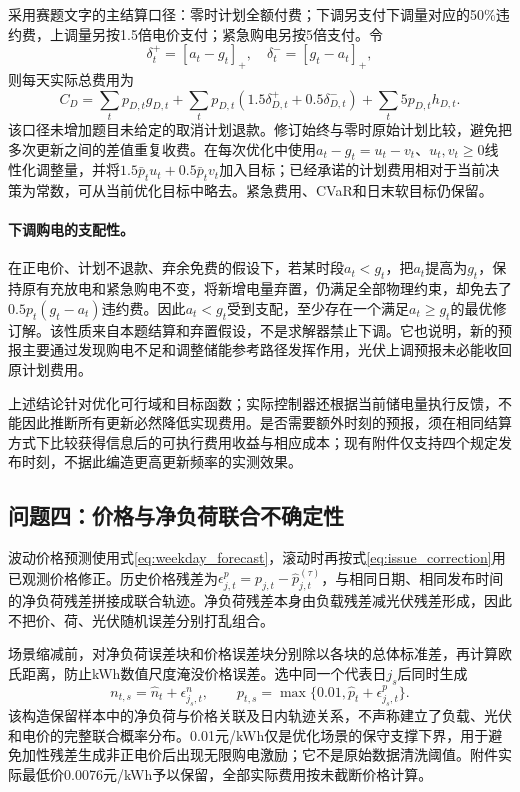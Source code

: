 采用赛题文字的主结算口径：零时计划全额付费；下调另支付下调量对应的50\%违约费，上调量另按1.5倍电价支付；紧急购电另按5倍支付。令
\begin{equation}
 \delta_t^+=[a_t-g_t]_+,\quad\delta_t^-=[g_t-a_t]_+,
\end{equation}
则每天实际总费用为
\begin{equation}
 C_D=\sum_t p_{D,t}g_{D,t}
 +\sum_t p_{D,t}(1.5\delta_{D,t}^++0.5\delta_{D,t}^-)
 +\sum_t5p_{D,t}h_{D,t}.
 \label{eq:settlement}
\end{equation}
该口径未增加题目未给定的取消计划退款。修订始终与零时原始计划比较，避免把多次更新之间的差值重复收费。在每次优化中使用$a_t-g_t=u_t-v_t$、$u_t,v_t\ge0$线性化调整量，并将$1.5\bar p_tu_t+0.5\bar p_tv_t$加入目标；已经承诺的计划费用相对于当前决策为常数，可从当前优化目标中略去。紧急费用、CVaR和日末软目标仍保留。

\paragraph{下调购电的支配性。}
在正电价、计划不退款、弃余免费的假设下，若某时段$a_t<g_t$，把$a_t$提高为$g_t$，保持原有充放电和紧急购电不变，将新增电量弃置，仍满足全部物理约束，却免去了$0.5p_t(g_t-a_t)$违约费。因此$a_t<g_t$受到支配，至少存在一个满足$a_t\ge g_t$的最优修订解。该性质来自本题结算和弃置假设，不是求解器禁止下调。它也说明，新的预报主要通过发现购电不足和调整储能参考路径发挥作用，光伏上调预报未必能收回原计划费用。

上述结论针对优化可行域和目标函数；实际控制器还根据当前储电量执行反馈，不能因此推断所有更新必然降低实现费用。是否需要额外时刻的预报，须在相同结算方式下比较获得信息后的可执行费用收益与相应成本；现有附件仅支持四个规定发布时刻，不据此编造更高更新频率的实测效果。

\subsection{问题四：价格与净负荷联合不确定性}

波动价格预测使用式\eqref{eq:weekday_forecast}，滚动时再按式\eqref{eq:issue_correction}用已观测价格修正。历史价格残差为$\epsilon^p_{j,t}=p_{j,t}-\widehat p_{j,t}^{(\tau)}$，与相同日期、相同发布时间的净负荷残差拼接成联合轨迹。净负荷残差本身由负载残差减光伏残差形成，因此不把价、荷、光伏随机误差分别打乱组合。

场景缩减前，对净负荷误差块和价格误差块分别除以各块的总体标准差，再计算欧氏距离，防止kWh数值尺度淹没价格误差。选中同一个代表日$j_s$后同时生成
\begin{equation}
 n_{t,s}=\widehat n_t+\epsilon^n_{j_s,t},\qquad
 p_{t,s}=\max\{0.01,\widehat p_t+\epsilon^p_{j_s,t}\}.
 \label{eq:joint_scenario}
\end{equation}
该构造保留样本中的净负荷与价格关联及日内轨迹关系，不声称建立了负载、光伏和电价的完整联合概率分布。0.01元/kWh仅是优化场景的保守支撑下界，用于避免加性残差生成非正电价后出现无限购电激励；它不是原始数据清洗阈值。附件实际最低价0.0076元/kWh予以保留，全部实际费用按未截断价格计算。

